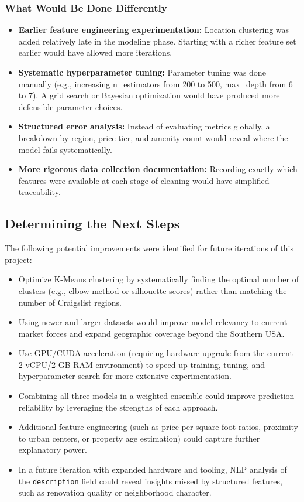 \subsubsection{What Would Be Done Differently}
\vspace{-12pt}
\begin{itemize}[itemsep=-9pt]
    \item \textbf{Earlier feature engineering experimentation:} Location clustering was added relatively late in the modeling phase. Starting with a richer feature set earlier would have allowed more iterations.
    \item \textbf{Systematic hyperparameter tuning:} Parameter tuning was done manually (e.g., increasing n\_estimators from 200 to 500, max\_depth from 6 to 7). A grid search or Bayesian optimization would have produced more defensible parameter choices.
    \item \textbf{Structured error analysis:} Instead of evaluating metrics globally, a breakdown by region, price tier, and amenity count would reveal where the model fails systematically.
    \item \textbf{More rigorous data collection documentation:} Recording exactly which features were available at each stage of cleaning would have simplified traceability.
\end{itemize}

\subsection{Determining the Next Steps}

\noindent
The following potential improvements were identified for future iterations of this project:

\vspace{-12pt}
\begin{itemize}[itemsep=-9pt]
    \item Optimize K-Means clustering by systematically finding the optimal number of clusters (e.g., elbow method or silhouette scores) rather than matching the number of Craigslist regions.
    \item Using newer and larger datasets would improve model relevancy to current market forces and expand geographic coverage beyond the Southern USA.
    \item Use GPU/CUDA acceleration (requiring hardware upgrade from the current 2 vCPU/2 GB RAM environment) to speed up training, tuning, and hyperparameter search for more extensive experimentation.
    \item Combining all three models in a weighted ensemble could improve prediction reliability by leveraging the strengths of each approach.
    \item Additional feature engineering (such as price-per-square-foot ratios, proximity to urban centers, or property age estimation) could capture further explanatory power.
    \item In a future iteration with expanded hardware and tooling, NLP analysis of the \texttt{description} field could reveal insights missed by structured features, such as renovation quality or neighborhood character.
\end{itemize}

